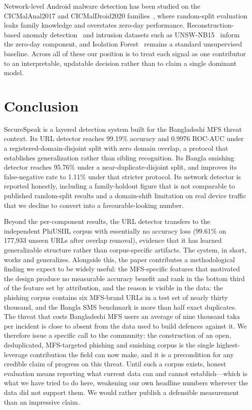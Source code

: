 \documentclass[manuscript,screen,review]{acmart}
\begin{document}
Network-level Android malware detection has been studied on the CICMalAnal2017 and CICMalDroid2020 families~\cite{lashkari2018,mahdavifar2020}, where random-split evaluation leaks family knowledge and overstates zero-day performance. Reconstruction-based anomaly detection~\cite{sakurada2014} and intrusion datasets such as UNSW-NB15~\cite{moustafa2015} inform the zero-day component, and Isolation Forest~\cite{liu2008} remains a standard unsupervised baseline. Across all of these our position is to treat each signal as one contributor to an interpretable, updatable decision rather than to claim a single dominant model.

\section{Conclusion}
SecureSpeak is a layered detection system built for the Bangladeshi MFS threat context. Its URL detector reaches 99.19\% accuracy and 0.9976 ROC-AUC under a registered-domain-disjoint split with zero domain overlap, a protocol that establishes generalization rather than sibling recognition. Its Bangla smishing detector reaches 95.76\% under a near-duplicate-disjoint split, and improves its false-negative rate to 1.11\% under that stricter protocol. Its network detector is reported honestly, including a family-holdout figure that is not comparable to published random-split results and a domain-shift limitation on real device traffic that we decline to convert into a favourable-looking number.

Beyond the per-component results, the URL detector transfers to the independent PhiUSIIL corpus with essentially no accuracy loss (99.61\% on 177{,}933 unseen URLs after overlap removal), evidence that it has learned generalizable structure rather than corpus-specific artifacts. The system, in short, works and generalizes. Alongside this, the paper contributes a methodological finding we expect to be widely useful: the MFS-specific features that motivated the design produce no measurable accuracy benefit and rank in the bottom third of the feature set by attribution, and the reason is visible in the data: the phishing corpus contains six MFS-brand URLs in a test set of nearly thirty thousand, and the Bangla SMS benchmark is more than half exact duplicates. The threat that costs Bangladeshi MFS users an average of nine thousand taka per incident is close to absent from the data used to build defences against it. We therefore issue a specific call to the community: the construction of an open, deduplicated, MFS-targeted phishing and smishing corpus is the single highest-leverage contribution the field can now make, and it is a precondition for any credible claim of progress on this threat. Until such a corpus exists, honest evaluation means reporting what current data can and cannot establish---which is what we have tried to do here, weakening our own headline numbers wherever the data did not support them. We would rather publish a defensible measurement than an impressive claim.
\end{document}
